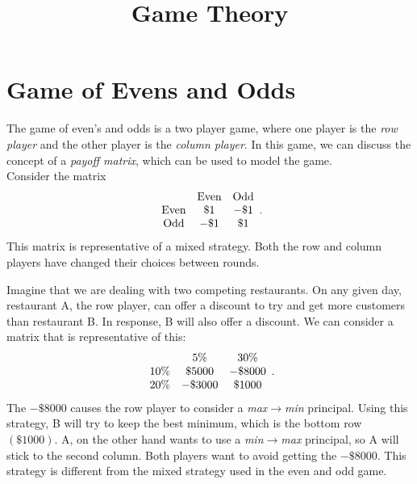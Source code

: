 \documentclass{hw}
\title{Game Theory}
\date{}
\author{}
\begin{document}
\maketitle

\section{Game of Evens and Odds}

The game of even's and odds is a two player game, where one player is the \textit{row player} and the other player is the \textit{column player}. In this game, we can discuss the concept of a \textit{payoff matrix}, which can be used to model the game.\\

Consider the matrix
\[
\begin{array}{c c c}
 & \text{Even} & \text{Odd}\\
\text{Even} & \$1 & -\$1\\
\text{Odd}&-\$1&\$1
\end{array}.
\]
This matrix is representative of a mixed strategy. Both the row and column players have changed their choices between rounds.

Imagine that we are dealing with two competing restaurants. On any given day, restaurant A, the row player, can offer a discount to try and get more customers than restaurant B. In response, B will also offer a discount. We can consider a matrix that is representative of this:
\[
\begin{array}{c c c}
 & 5\% & 30\%\\
10\% & \$5000 & -\$8000\\
20\% & -\$3000 & \$1000
\end{array}.
\]
The $-\$8000$ causes the row player to consider a \textit{max$\to$min} principal. Using this strategy, B will try to keep the best minimum, which is the bottom row $(\$1000)$. A, on the other hand wants to use a \textit{min$\to$max} principal, so A will stick to the second column. Both players want to avoid getting the $-\$8000$. This strategy is different from the mixed strategy used in the even and odd game.
\end{document}

